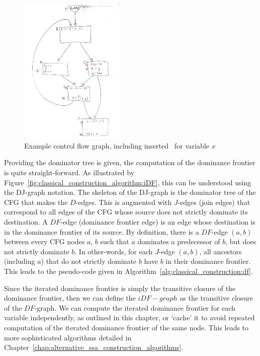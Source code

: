\begin{figure}
\includegraphics[width=5cm]{ssa_variablex_label.pdf}
\caption{\label{fig:classical_construction_algorithm:examplecfg_varx}Example control flow graph, including
inserted \phiops\ for variable $x$
}
\end{figure}

Providing the dominator tree is given, the computation of the dominance frontier is quite straight-forward. As illustrated by Figure~\ref{fig:classical_construction_algorithm:iDF}, this can be understood using the DJ-graph notation. The skeleton of the DJ-graph is the dominator tree of the CFG that makes the $D$-edges. This is augmented with $J$-edges (join edges) that correspond to all edges of the CFG whose source does not strictly dominate its destination. A $DF$-edge (dominance frontier edge) is an edge whose destination is in the dominance frontier of its source. By definition, there is a $DF$-edge $(a,b)$ between every CFG nodes $a$, $b$ such that $a$ dominates a predecessor of $b$, but does not strictly dominate $b$. 
In other-words, for each  $J$-edge $(a,b)$, all ancestors (including
$a$) that do not strictly dominate $b$ have $b$ in their dominance
frontier. This leads to the pseudo-code given in
Algorithm~\ref{alg:classical_construction:df}.

Since the iterated dominance frontier is simply the transitive closure
of the dominance frontier, then we can define the $iDF-graph$ as the transitive closure of the $DF$-graph. 
We can compute the iterated dominance frontier for each variable independently, as outlined in this chapter, or `cache' it to avoid repeated computation of the iterated dominance frontier of the same node. This leads to more sophisticated algorithms detailed in Chapter~\ref{chap:alternative_ssa_construction_algorithms}.

